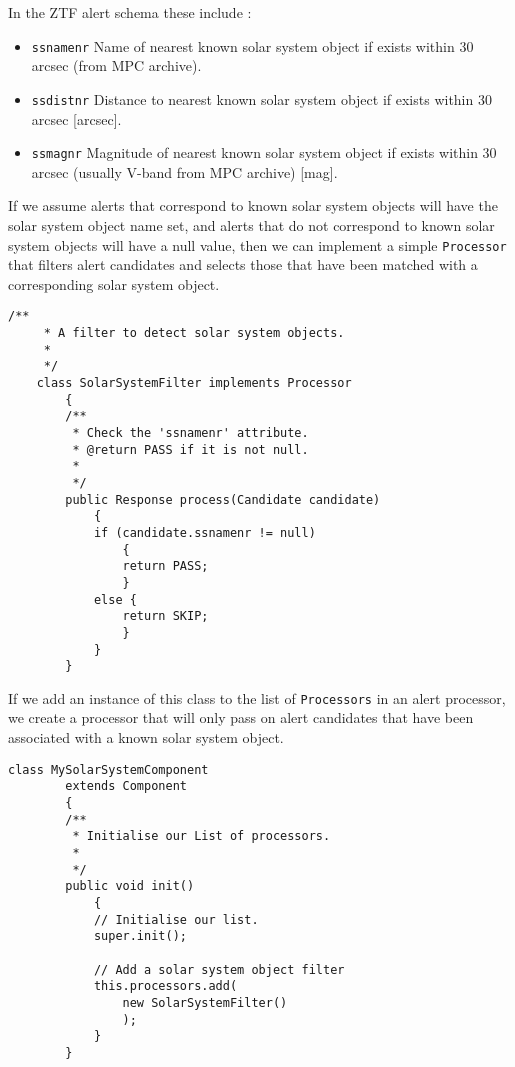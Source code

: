 \documentclass{article}
\newcommand{\ztf} {ZTF\xspace}
\begin{document}
In the \ztf alert schema these include :
\begin{itemize}
  \item \texttt{ssnamenr} Name of nearest known solar system object if exists within 30 arcsec (from MPC archive).
  \item \texttt{ssdistnr} Distance to nearest known solar system object if exists within 30 arcsec [arcsec].
  \item \texttt{ssmagnr} Magnitude of nearest known solar system object if exists within 30 arcsec (usually V-band from MPC archive) [mag].
\end{itemize}

If we assume alerts that correspond to known solar system objects will have the solar system object name set, and alerts that do not correspond to known solar system objects will have a null value, then we can implement a simple \texttt{Processor} that filters alert candidates and selects those that have been matched with a corresponding solar system object.

\begin{lstlisting}[style=Java]
    /**
     * A filter to detect solar system objects.
     *
     */
    class SolarSystemFilter implements Processor
        {
        /**
         * Check the 'ssnamenr' attribute.
         * @return PASS if it is not null.
         *
         */
        public Response process(Candidate candidate)
            {
            if (candidate.ssnamenr != null)
                {
                return PASS;
                }
            else {
                return SKIP;
                }
            }
        }
\end{lstlisting}

If we add an instance of this class to the list of \texttt{Processors} in an alert processor, we create a processor that will only pass on alert candidates that have been associated with a known solar system object.

\begin{lstlisting}[style=Java]
    class MySolarSystemComponent
        extends Component
        {
        /**
         * Initialise our List of processors.
         *
         */
        public void init()
            {
            // Initialise our list.
            super.init();

            // Add a solar system object filter
            this.processors.add(
                new SolarSystemFilter()
                );
            }
        }
\end{lstlisting}
\end{document}
